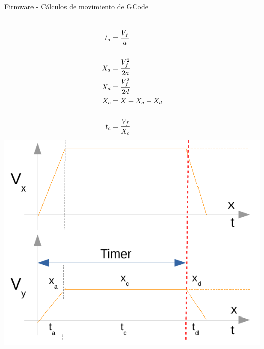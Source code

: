\documentclass[aspectratio= 43]{beamer}
\begin{document}
\begin{frame}[fragile]{Firmware - Cálculos de movimiento de GCode}
   \begin{columns}
\begin{align}
   \notag
   t_a   &= \frac{V_f}{a} \\
   \notag
   \\
   \notag
   X_a   &= \frac{V_f^2}{2a} \\
   \notag
   X_d   &= \frac{V_f^2}{2d} \\
   \notag
   X_c   &= X-X_a-X_d \\
   \notag
   \\
   \notag
   t_c   &= \frac{V_f}{X_c}
   \notag
\end{align}
      \includegraphics[width=\textwidth, left]{./Figures/gcode2.pdf}
   \end{columns}
\end{frame}

\end{document}
